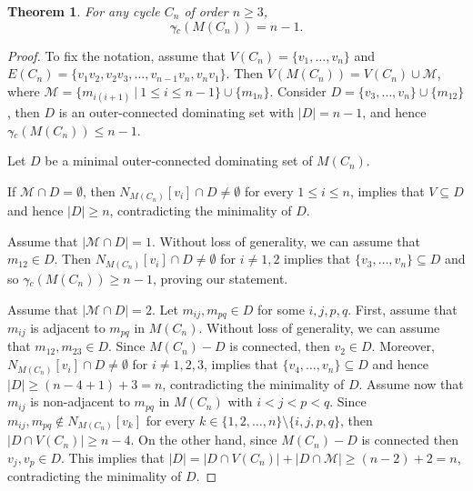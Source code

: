 \documentclass[a4paper,12pt, reqno]{amsart}
\newtheorem{Theorem}{Theorem}[section]
\begin{document}
\begin{Theorem}\label{theomoutdomcycle}
For any cycle $C_n$ of order $n \geq 3$,  $$\gamma{\tilde{}} _{c}(M(C_{n}))=n-1.$$
\end{Theorem}
\begin{proof}
To fix the notation, assume that $V(C_n)=\{v_1, \dots, v_n\}$ and $E(C_n)=\{v_1v_2, v_2v_3,\dots,v_{n-1}v_n,v_nv_1\}$. Then $V(M(C_n))=V(C_n)\cup \mathcal{M}$, where $\mathcal{M}=\{ m_{i(i+1)}~|~1\leq i \leq n-1 \}\cup\{m_{1n}\}$.
Consider $D=\{v_3 , \dots, v_n\} \cup \{m_{12}\}$, then $D$ is an outer-connected dominating set with $|D|=n-1$, and hence $\gamma{\tilde{}} _{c}(M(C_{n}))\le n-1.$

 Let $D$ be a minimal outer-connected dominating set of $M(C_{n})$.




If $\mathcal{M} \cap D=\emptyset$, then $N_{M(C_{n})}[v_i]\cap D \neq \emptyset$ for every $1 \leq i \leq n$, implies that $V \subseteq D$ and hence $|D| \geq n$, contradicting the minimality of $D$. 




Assume that $|\mathcal{M} \cap D|=1$. Without loss of generality, we can assume that $m_{12} \in D$. Then $N_{M(C_{n})}[v_i]\cap D \neq \emptyset$ for  $ i\neq 1,2$ implies that $\{v_3, \dots, v_n\} \subseteq D$ and so $\gamma{\tilde{}} _{c}(M(C_{n})) \geq n-1$, proving our statement.




Assume that $|\mathcal{M} \cap D|=2$. Let $m_{ij}, m_{pq} \in D$ for some $i,j,p,q$. First, assume that $m_{ij}$ is adjacent to $m_{pq}$ in $M(C_n)$. Without loss of generality, we can assume that $m_{12}, m_{23} \in D$. Since $M(C_n)-D$ is connected, then $v_2 \in D$. Moreover, $N_{M(C_{n})}[v_i]\cap D \neq \emptyset$ for  $ i\neq 1,2,3$, implies that $\{v_4, \dots, v_n\} \subseteq D$ and hence $|D| \geq (n-4+1)+3=n$, contradicting the minimality of $D$.
Assume now that $m_{ij}$ is non-adjacent to $m_{pq}$ in $M(C_n)$ with $i<j<p<q$.
Since $m_{ij}, m_{pq} \notin N_{M(C_{n})}[v_k]$ for every $k \in \{ 1, 2, \dots, n\}\setminus\{i,j,p,q\}$, then $|D \cap V(C_n)| \geq n-4$. On the other hand, since $M(C_n)-D$ is connected then $v_j, v_p \in D$. This implies that $|D|=|D \cap V(C_n)|+|D \cap \mathcal{M}| \geq (n-2)+2=n$, contradicting the minimality of $D$.


\end{proof}
\end{document}

